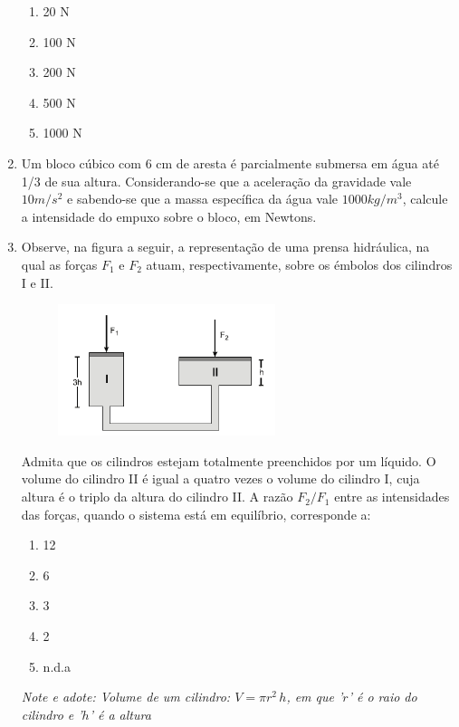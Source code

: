 \documentclass[12pt,letterpaper,fleqn]{article}
\begin{document}
\begin{enumerate}
    \begin{enumerate}
        \item 20 N
        \item 100 N
        \item 200 N
        \item 500 N
        \item 1000 N
    \end{enumerate}
    
    \item Um bloco cúbico com 6 cm de aresta é parcialmente submersa em água até 1/3 de sua altura. Considerando-se que a aceleração da gravidade vale $10 m/s^2$ e sabendo-se que a massa específica da água vale $1000 kg/m^3$, calcule a intensidade do empuxo sobre o bloco, em Newtons.
    
    \item Observe, na figura a seguir, a representação de uma prensa hidráulica, na qual as forças $F_1$ e $F_2$ atuam, respectivamente, sobre os émbolos dos cilindros I e II.
    \begin{figure}[H]
        \centering
        \includegraphics[width=0.6\textwidth]{ex_4.png}
    \end{figure}
    
    Admita que os cilindros estejam totalmente preenchidos por um líquido. O volume do cilindro II é igual a quatro vezes o volume do cilindro I, cuja altura é o triplo da altura do cilindro II. A razão $F_2/F_1$ entre as intensidades das forças, quando o sistema está em equilíbrio, corresponde a:
    \begin{enumerate}
        \item 12
        \item 6
        \item 3
        \item 2
        \item n.d.a
    \end{enumerate}
    
    \textit{Note e adote: Volume de um cilindro: $V = \pi r^2\,h$, em que '$r$' é o raio do cilindro e '$h$' é a altura}
    

\end{enumerate}
\end{document}
